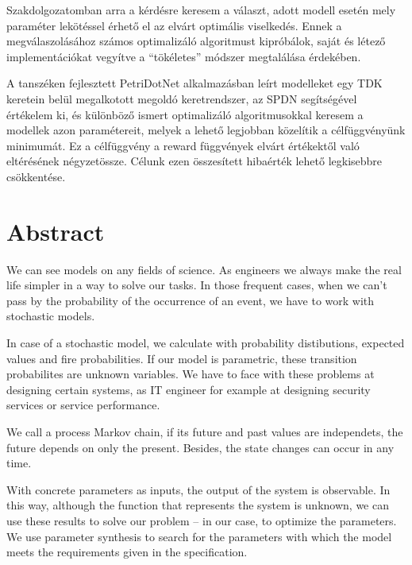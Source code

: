 Szakdolgozatomban arra a kérdésre keresem a választ, adott modell esetén mely paraméter lekötéssel érhető el az elvárt optimális viselkedés. Ennek a megválaszolásához számos optimalizáló algoritmust kipróbálok, saját és létező implementációkat vegyítve a ``tökéletes'' módszer megtalálása érdekében.

A tanszéken fejlesztett PetriDotNet alkalmazásban leírt modelleket egy TDK keretein belül megalkotott megoldó keretrendszer, az SPDN segítségével értékelem ki, és különböző ismert optimalizáló algoritmusokkal keresem a modellek azon paramétereit, melyek a lehető legjobban közelítik a célfüggvényünk minimumát. Ez a célfüggvény a reward függvények elvárt értékektől való eltérésének négyzetössze. Célunk ezen összesített hibaérték lehető legkisebbre csökkentése.


\vfill
\selectenglish


\chapter*{Abstract}

We can see models on any fields of science. As engineers we always make the real life simpler in a way to solve our tasks. In those frequent cases, when we can't pass by the probability of the occurrence of an event, we have to work with stochastic models.

In case of a stochastic model, we calculate with probability distibutions, expected values and fire probabilities. If our model is parametric, these transition probabilites are unknown variables. We have to face with these problems at designing certain systems, as IT engineer for example at designing security services or service performance.

We call a process Markov chain, if its future and past values are independets, the future depends on only the present. Besides, the state changes can occur in any time. 

With concrete parameters as inputs, the output of the system is observable. In this way, although the function that represents the system is unknown, we can use these results to solve our problem -- in our case, to optimize the parameters. We use parameter synthesis to search for the parameters with which the model meets the requirements given in the specification.

